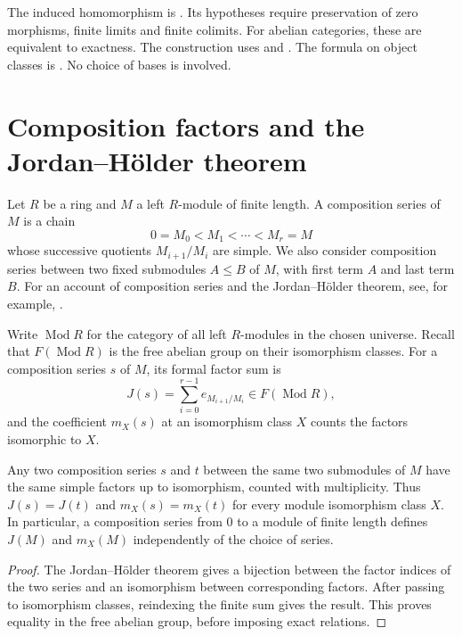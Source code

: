 \begin{implementation}
The induced homomorphism is .
Its hypotheses require preservation of zero morphisms, finite limits and
finite colimits. For abelian categories, these are equivalent to exactness.
The construction uses
 and
. The formula on object classes is
. No choice of bases is involved.
\end{implementation}

\section{Composition factors and the Jordan--H\"older theorem}
\label{lib:kzero:finite-length}

Let $R$ be a ring and $M$ a left $R$-module of finite length. A composition series of $M$ is a chain
\[
 0=M_0<M_1<\cdots<M_r=M
\]
whose successive quotients $M_{i+1}/M_i$ are simple. We also consider
composition series between two fixed submodules $A\leq B$ of $M$, with
first term $A$ and last term $B$. For an account of composition series and
the Jordan--H\"older theorem, see, for example,
\cite[\S1.1, especially Theorem~1.1.4]{Benson1998}.

\begin{definition}
Write $\operatorname{Mod}R$ for the category of all left $R$-modules in
the chosen universe. Recall that $F(\operatorname{Mod}R)$ is the free
abelian group on their isomorphism classes.
For a composition series $s$ of $M$, its formal factor sum is
\[
 J(s)=\sum_{i=0}^{r-1} e_{M_{i+1}/M_i}
 \in F(\operatorname{Mod}R),
\]
and the coefficient $m_X(s)$ at an isomorphism class $X$ counts the factors
isomorphic to $X$.
\end{definition}

\begin{proposition}
\label{lib:kzero:series-independent}
Any two composition series $s$ and $t$ between the same two submodules
of $M$ have the same simple factors up to isomorphism, counted with
multiplicity.
Thus $J(s)=J(t)$ and $m_X(s)=m_X(t)$ for every module
isomorphism class $X$. In particular, a composition series from $0$ to a
module of finite length defines $J(M)$ and $m_X(M)$ independently of
the choice of series.
\end{proposition}
\begin{proof}
The Jordan--H\"older theorem gives a bijection between the factor indices of
the two series and an isomorphism between corresponding factors. After
passing to isomorphism classes, reindexing the finite sum gives the result.
This proves equality in the free abelian group, before imposing exact relations.
\end{proof}


